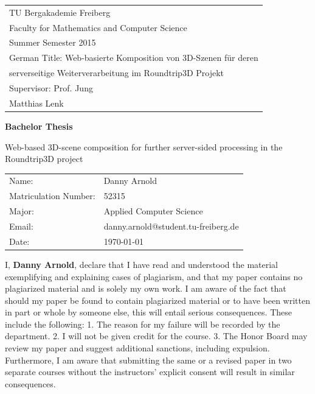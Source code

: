 \documentclass[
	 11pt,         %
	 a4paper,      %
	 oneside,
	 ]{article}
\newcommand{\mytitle}{Web-based 3D-scene composition for further server-sided processing in the Roundtrip3D project}
\newcommand{\myauthor}{Danny Arnold}
\newcommand{\myseminar}{Web-basierte Komposition von 3D-Szenen für deren}
\newcommand{\mydozent}{Prof. Jung}
\newcommand{\mydozentTwo}{Matthias Lenk}
\newcommand{\myseminarTwo}{serverseitige Weiterverarbeitung im Roundtrip3D Projekt}
\newcommand{\mysemester}{Summer Semester 2015}
\newcommand{\emptypage}[0]{
	\clearpage
	\thispagestyle{empty}
	\mbox{}
	\newpage
}
\begin{document}
\begin{titlepage}
\begin{tabular}[l]{l}
TU Bergakademie Freiberg\\
Faculty for Mathematics and Computer Science\\
\mysemester\\
German Title: \myseminar\\
\phantom{German Title: }\myseminarTwo\\
Supervisor: \mydozent\\
\phantom{Supervisor: }\mydozentTwo\\
\end{tabular}

\vspace{4cm}
\begin{center}
\textbf{\large Bachelor Thesis} %
\vspace{0.5\baselineskip}

{\huge
\mytitle
}
\end{center}

\vfill
\begin{tabular}[l]{ll}
Name:           & \myauthor\\
Matriculation Number: & 52315\\
Major:    & Applied Computer Science\\
Email: & danny.arnold@student.tu-freiberg.de\\
Date: & \today \\
\end{tabular}

\end{titlepage}
\newpage

\emptypage

\onehalfspacing


\thispagestyle{empty}
\vspace*{100pt}
I, \textbf{\myauthor}, declare that I have read and understood
the material exemplifying and explaining cases of plagiarism, and that my paper contains no plagiarized
material and is solely my own work. I am aware of the fact that should my paper be found to
contain plagiarized material or to have been written in part or whole by someone else, this will
entail serious consequences. These include the following:
1. The reason for my failure will be recorded by the department.
2. I will not be given credit for the course.
3. The Honor Board may review my paper and suggest additional sanctions, including
expulsion.
Furthermore, I am aware that submitting the same or a revised paper in two separate courses without
the instructors' explicit consent will result in similar consequences.\cite{Antiplagiatserklrung}
\vspace*{50pt}
\end{document}
